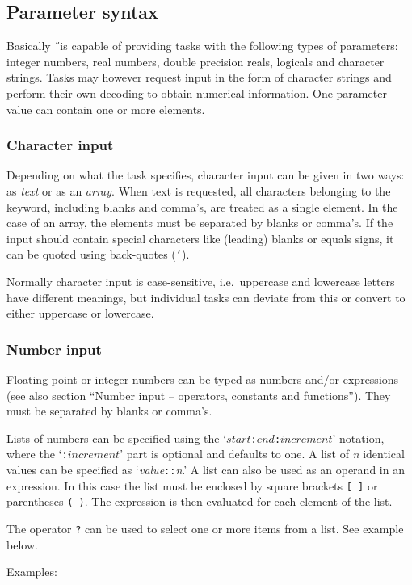 \subsection*{Parameter syntax}
Basically \H\ is capable of providing tasks with the following types of
parameters:
integer numbers, real numbers, double precision reals, logicals and
character strings.
Tasks may however request input in the form of character strings and perform
their own decoding to obtain numerical information.
One parameter value can contain one or more elements.

\subsubsection*{Character input}
Depending on what the task specifies, character input can be given in two ways:
as {\em text\/} or as an {\em array\/}. When text is requested, all characters
belonging to the keyword, including blanks and comma's, are treated as a single
element.
In the case of an array, the elements must be separated by blanks or comma's.
If the input should contain special characters like (leading) blanks or
equals signs, it can be quoted using back-quotes ({\tt `}).

Normally character input is case-sensitive,
i.e.\ uppercase and lowercase letters have different meanings,
but individual tasks can deviate
from this or convert to either uppercase or lowercase.

\subsubsection*{Number input}
Floating point or integer numbers can be typed as numbers and/or
expressions (see also section ``Number input -- operators,
constants and functions'').
They must be separated by blanks or comma's.

Lists of numbers can be specified using the
`$start${\tt :}$end${\tt :}$increment$'
notation, where the `{\tt :}$increment$' part is optional and defaults to one.
A list of {\it n} identical values can be specified as
`{\it value\/}{\tt ::}{\it n}.'
A list can also be used as an operand in an expression.
In this case the list must be enclosed by square brackets {\tt [ ]} or
parentheses {\tt ( )}.
The expression is then evaluated for each element of the list.

The operator {\tt ?} can be used to select one or more items from a list.
See example below.

Examples:


